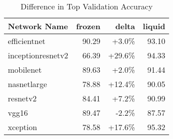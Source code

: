 \begin{table}[htb]
\centering

    \begin{tabular}{ l  r  r  r } \hline
    Network Name       & frozen & delta    & liquid \\ \hline 
    efficientnet       & 90.29  &  +3.0\%  & 93.10 \\
    inceptionresnetv2  & 66.39  & +29.6\%  & 94.33 \\
    mobilenet          & 89.63  &  +2.0\%  & 91.44 \\
    nasnetlarge        & 78.88  & +12.4\%  & 90.05 \\
    resnetv2           & 84.41  &  +7.2\%  & 90.99 \\
    vgg16              & 89.47  &  -2.2\%  & 87.57 \\
    xception           & 78.58  & +17.6\%  & 95.32 \\ \hline 
    \end{tabular}

    \caption{Difference in Top Validation Accuracy}
    \label{tbl:training_diff}
\end{table}